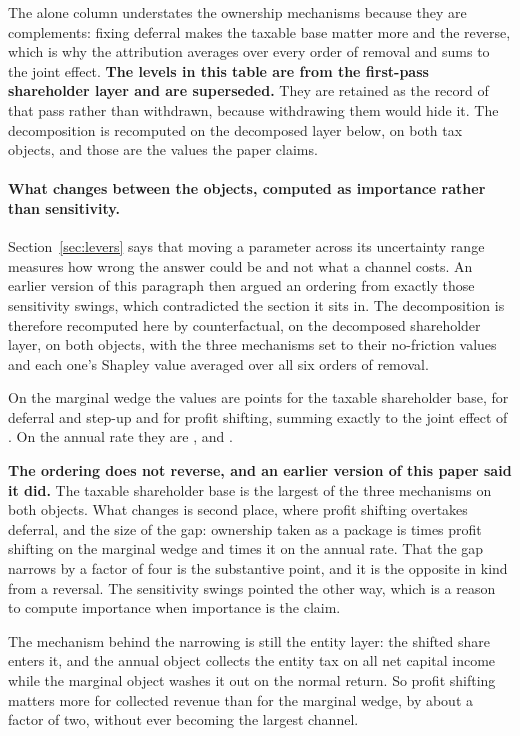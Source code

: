 The alone column understates the ownership mechanisms because they are complements: fixing
deferral makes the taxable base matter more and the reverse, which is why the attribution
averages over every order of removal and sums to the joint effect. \textbf{The levels in this table are from
the first-pass shareholder layer and are superseded.} They are retained as the record of that
pass rather than withdrawn, because withdrawing them would hide it. The decomposition is
recomputed on the decomposed layer below, on both tax objects, and those are the values the
paper claims.

\paragraph{What changes between the objects, computed as importance rather than sensitivity.}
Section~\ref{sec:levers} says that moving a parameter across its uncertainty range measures how
wrong the answer could be and not what a channel costs. An earlier version of this paragraph then
argued an ordering from exactly those sensitivity swings, which contradicted the section it sits
in. The decomposition is therefore recomputed here by counterfactual, on the decomposed
shareholder layer, on both objects, with the three mechanisms set to their no-friction values and
each one's Shapley value averaged over all six orders of removal.

On the marginal wedge the values are  points for the taxable shareholder base,
 for deferral and step-up and  for profit shifting,
summing exactly to the joint effect of . On the annual rate they are
,  and .

\textbf{The ordering does not reverse, and an earlier version of this paper said it did.} The
taxable shareholder base is the largest of the three mechanisms on both objects. What changes is
second place, where profit shifting overtakes deferral, and the size of the gap: ownership taken
as a package is  times profit shifting on the marginal wedge and
 times it on the annual rate. That the gap narrows by a factor of four
is the substantive point, and it is the opposite in kind from a reversal. The sensitivity swings
pointed the other way, which is a reason to compute importance when importance is the claim.

The mechanism behind the narrowing is still the entity layer: the shifted share enters it, and
the annual object collects the entity tax on all net capital income while the marginal object
washes it out on the normal return. So profit shifting matters more for collected revenue than
for the marginal wedge, by about a factor of two, without ever becoming the largest channel.

